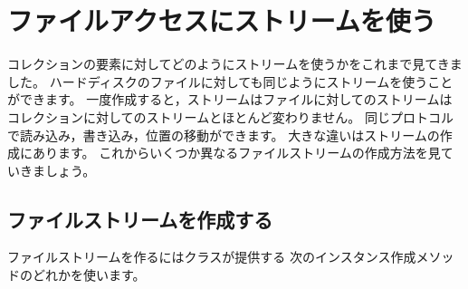 \documentclass[a4paper,10pt,twoside]{book}
\begin{document}
{%
\section{ファイルアクセスにストリームを使う}

コレクションの要素に対してどのようにストリームを使うかをこれまで見てきました。
ハードディスクのファイルに対しても同じようにストリームを使うことができます。
一度作成すると，ストリームはファイルに対してのストリームはコレクションに対してのストリームとほとんど変わりません。
同じプロトコルで読み込み，書き込み，位置の移動ができます。
大きな違いはストリームの作成にあります。
これからいくつか異なるファイルストリームの作成方法を見ていきましょう。


\subsection{ファイルストリームを作成する}


ファイルストリームを作るにはクラスが提供する
次のインスタンス作成メソッドのどれかを使います。

\begin{description}


\end{description}}
\end{document}
